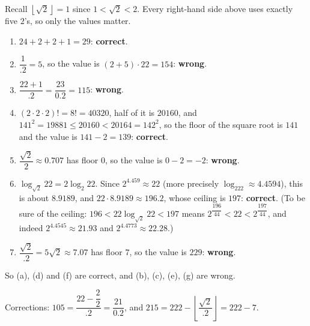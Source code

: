 Recall $\left\lfloor\sqrt2\right\rfloor=1$ since $1<\sqrt2<2$. Every right-hand side above uses exactly five $2$'s, so only the values matter.
\begin{enumerate}
\item[(a)] $24+2+2+1=29$: \textbf{correct}.
\item[(b)] $\dfrac{1}{.2}=5$, so the value is $(2+5)\cdot22=154$: \textbf{wrong}.
\item[(c)] $\dfrac{22+1}{.2}=\dfrac{23}{0.2}=115$: \textbf{wrong}.
\item[(d)] $(2\cdot2\cdot2)!=8!=40320$, half of it is $20160$, and $141^2=19881\le20160<20164=142^2$, so the floor of the square root is $141$ and the value is $141-2=139$: \textbf{correct}.
\item[(e)] $\dfrac{\sqrt2}{2}\approx0.707$ has floor $0$, so the value is $0-2=-2$: \textbf{wrong}.
\item[(f)] $\log_{\sqrt2}22=2\log_2 22$. Since $2^{4.459}\approx22$ (more precisely $\log_222\approx4.4594$), this is about $8.9189$, and $22\cdot8.9189\approx196.2$, whose ceiling is $197$: \textbf{correct}. (To be sure of the ceiling: $196<22\log_{\sqrt2}22<197$ means $2^{\dfrac{196}{44}}<22<2^{\dfrac{197}{44}}$, and indeed $2^{4.4545}\approx21.93$ and $2^{4.4773}\approx22.28$.)
\item[(g)] $\dfrac{\sqrt2}{.2}=5\sqrt2\approx7.07$ has floor $7$, so the value is $229$: \textbf{wrong}.
\end{enumerate}
So (a), (d) and (f) are correct, and (b), (c), (e), (g) are wrong.

Corrections: $105=\dfrac{22-\dfrac22}{.2}=\dfrac{21}{0.2}$, and $215=222-\left\lfloor\dfrac{\sqrt2}{.2}\right\rfloor=222-7$.
